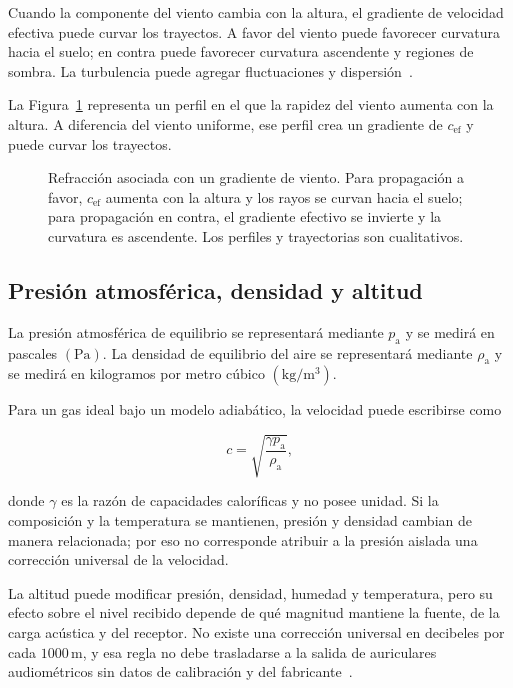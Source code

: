 Cuando la componente del viento cambia con la altura, el gradiente de
velocidad efectiva puede curvar los trayectos. A favor del viento puede
favorecer curvatura hacia el suelo; en contra puede favorecer curvatura
ascendente y regiones de sombra. La turbulencia puede agregar fluctuaciones y
dispersión~\cite{xiangBlauert2021,iso9613_1_1993}.

La Figura~\ref{fig:u9-gradiente-viento} representa un perfil en el que la
rapidez del viento aumenta con la altura. A diferencia del viento uniforme,
ese perfil crea un gradiente de \(c_\mathrm{ef}\) y puede curvar los
trayectos.

\begin{figure}[htbp]
    \centering
    
    \caption{Refracción asociada con un gradiente de viento. Para propagación
    a favor, \(c_\mathrm{ef}\) aumenta con la altura y los rayos se curvan
    hacia el suelo; para propagación en contra, el gradiente efectivo se
    invierte y la curvatura es ascendente. Los perfiles y trayectorias son
    cualitativos.}
    \label{fig:u9-gradiente-viento}
\end{figure}

\subsection{Presión atmosférica, densidad y altitud}
\label{sec:u9-presion-altitud}

La presión atmosférica de equilibrio se representará mediante \(p_\mathrm{a}\)
y se medirá en pascales \((\text{Pa})\). La densidad de equilibrio del aire se
representará mediante \(\rho_\mathrm{a}\) y se medirá en kilogramos por metro
cúbico \((\text{kg}/\text{m}^3)\).

Para un gas ideal bajo un modelo adiabático, la velocidad puede
escribirse como~\cite{xiangBlauert2021,iso9613_1_1993}

\begin{equation}
    c=\sqrt{\frac{\gamma p_\mathrm{a}}{\rho_\mathrm{a}}},
    \label{eq:u9-velocidad-presion-densidad}
\end{equation}

donde \(\gamma\) es la razón de capacidades caloríficas y no posee unidad. Si
la composición y la temperatura se mantienen, presión y densidad cambian de
manera relacionada; por eso no corresponde atribuir a la presión aislada una
corrección universal de la velocidad.

La altitud puede modificar presión, densidad, humedad y temperatura,
pero su efecto sobre el nivel recibido depende de qué magnitud mantiene la
fuente, de la carga acústica y del receptor. No existe una corrección universal
en decibeles por cada \(1000\,\text{m}\), y esa regla no debe trasladarse a la
salida de auriculares audiométricos sin datos de calibración y del fabricante~\cite{xiangBlauert2021,iso9613_1_1993}.

